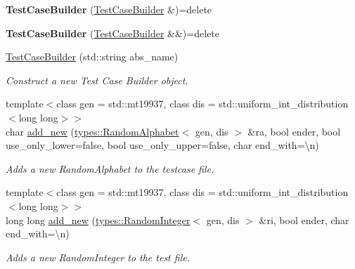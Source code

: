 \begin{DoxyCompactItemize}
\item 
\mbox{\label{classtestcaser_1_1maker_1_1TestCaseBuilder_a1fd3aaeb2829fa473f769b796958409b}} 
{\bfseries Test\+Case\+Builder} (\mbox{\hyperlink{classtestcaser_1_1maker_1_1TestCaseBuilder}{Test\+Case\+Builder}} \&)=delete
\item 
\mbox{\label{classtestcaser_1_1maker_1_1TestCaseBuilder_a8844b0c922621007832f3059e927ceb0}} 
{\bfseries Test\+Case\+Builder} (\mbox{\hyperlink{classtestcaser_1_1maker_1_1TestCaseBuilder}{Test\+Case\+Builder}} \&\&)=delete
\item 
\mbox{\hyperlink{classtestcaser_1_1maker_1_1TestCaseBuilder_a1faa00929cc5be8c8bbb312541858e61}{Test\+Case\+Builder}} (std\+::string abs\+\_\+name)
\begin{DoxyCompactList}\small\item\em Construct a new Test Case Builder object. \end{DoxyCompactList}\item 
{\footnotesize template$<$class gen  = std\+::mt19937, class dis  = std\+::uniform\+\_\+int\+\_\+distribution$<$long long$>$$>$ }\\char \mbox{\hyperlink{classtestcaser_1_1maker_1_1TestCaseBuilder_a5e148b382134f054b008cc22b063eae0}{add\+\_\+new}} (\mbox{\hyperlink{structtestcaser_1_1maker_1_1types_1_1RandomAlphabet}{types\+::\+Random\+Alphabet}}$<$ gen, dis $>$ \&ra, bool ender, bool use\+\_\+only\+\_\+lower=false, bool use\+\_\+only\+\_\+upper=false, char end\+\_\+with=\textquotesingle{}\textbackslash{}n\textquotesingle{})
\begin{DoxyCompactList}\small\item\em Adds a new Random\+Alphabet to the testcase file. \end{DoxyCompactList}\item 
{\footnotesize template$<$class gen  = std\+::mt19937, class dis  = std\+::uniform\+\_\+int\+\_\+distribution$<$long long$>$$>$ }\\long long \mbox{\hyperlink{classtestcaser_1_1maker_1_1TestCaseBuilder_a25632150eaf0252e0995d5da74f76e22}{add\+\_\+new}} (\mbox{\hyperlink{classtestcaser_1_1maker_1_1types_1_1RandomInteger}{types\+::\+Random\+Integer}}$<$ gen, dis $>$ \&ri, bool ender, char end\+\_\+with=\textquotesingle{}\textbackslash{}n\textquotesingle{})
\begin{DoxyCompactList}\small\item\em Adds a new Random\+Integer to the test file. \end{DoxyCompactList}\item 

\end{DoxyCompactItemize}
